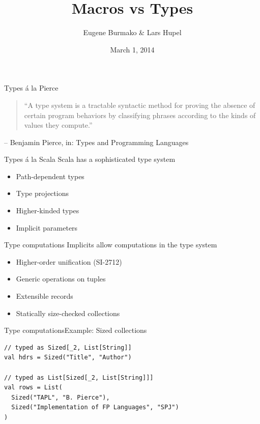 \documentclass{beamer}
\begin{document}
  \title{Macros vs Types}
  \author{Eugene Burmako \& Lars Hupel}
  \date{March 1, 2014}

{
\begin{frame}
  \titlepage
\end{frame}
}

\begin{frame}
\vskip40pt
\begin{center}
\end{center}
\end{frame}

\begin{frame}{Types \'a la Pierce}
  \begin{quote}
    ``A type system is a tractable syntactic method for \alert<2>{proving the absence of certain program behaviors} by classifying phrases according to the kinds of values they compute.''
  \end{quote}
  \hfill -- Benjamin Pierce, in: Types and Programming Languages
\end{frame}

\begin{frame}{Types \'a la Scala}
  Scala has a sophisticated type system
  \begin{itemize}
    \item Path-dependent types
    \item Type projections
    \item Higher-kinded types
    \item Implicit parameters
  \end{itemize}
\end{frame}

\begin{frame}{Type computations}
  Implicits allow computations in the type system

  \begin{itemize}
    \item Higher-order unification (SI-2712)
    \item Generic operations on tuples
    \item Extensible records
    \item Statically size-checked collections
  \end{itemize}
\end{frame}

\begin{frame}[fragile]{Type computations}{Example: Sized collections}
  \begin{verbatim}
// typed as Sized[_2, List[String]]
val hdrs = Sized("Title", "Author")

// typed as List[Sized[_2, List[String]]]
val rows = List(
  Sized("TAPL", "B. Pierce"),
  Sized("Implementation of FP Languages", "SPJ")
)
  \end{verbatim}
\end{frame}
\end{document}
